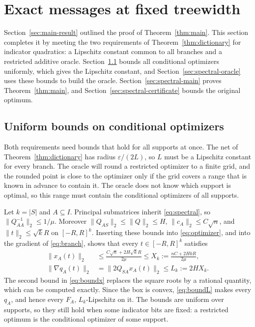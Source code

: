 \section{Exact messages at fixed treewidth}\label{sec:spectral}
Section~\ref{sec:main-result} outlined the proof of
Theorem~\ref{thm:main}. This section completes it by meeting the two
requirements of Theorem~\ref{thm:dictionary} for indicator quadratics: a
Lipschitz constant common to all branches and a restricted additive
oracle. Section~\ref{sec:spectral-bounds} bounds all conditional
optimizers uniformly, which gives the Lipschitz constant, and
Section~\ref{sec:spectral-oracle} uses these bounds to build the oracle.
Section~\ref{sec:spectral-main} proves Theorem~\ref{thm:main}, and
Section~\ref{sec:spectral-certificate} bounds the original optimum.

\subsection{Uniform bounds on conditional optimizers}
\label{sec:spectral-bounds}
Both requirements need bounds that hold for all supports at once. The
net of Theorem~\ref{thm:dictionary} has radius $\varepsilon/(2L)$, so $L$
must be a Lipschitz constant for every branch. The oracle will round a
restricted optimizer to a finite grid, and the rounded point is close to
the optimizer only if the grid covers a range that is known in advance
to contain it. The oracle does not know which support is optimal, so
this range must contain the conditional optimizers of all supports.

Let $k=|S|$ and $A\subseteq I$. Principal submatrices inherit
\eqref{eq:spectral}, so $\|Q_{AA}^{-1}\|_2\le1/\mu$. Moreover
$\|Q_{AS}\|_2\le\|Q\|_2\le H$, $\|c_A\|_2\le C\sqrt n$, and
$\|t\|_2\le\sqrt kR$ on $[-R,R]^k$. Inserting these bounds into
\eqref{eq:optimizer}, and into the gradient of \eqref{eq:branch}, shows
that every $t\in[-R,R]^k$ satisfies
\begin{align}
 \|x_A(t)\|_2&\le\frac{C\sqrt n+2H\sqrt{k}R}{2\mu}
                    \le X_k:=\frac{nC+2HkR}{2\mu},\label{eq:boundx}\\
 \|\nabla q_A(t)\|_2&=\|2Q_{SA}x_A(t)\|_2
                    \le L_k:=2HX_k.\label{eq:boundL}
\end{align}
The second bound in \eqref{eq:boundx} replaces the square roots by a
rational quantity, which can be computed exactly. Since the box is
convex, \eqref{eq:boundL} makes every $q_A$, and hence every $F_A$,
$L_k$-Lipschitz on it. The bounds are uniform over supports, so they
still hold when some indicator bits are fixed: a restricted optimum is
the conditional optimizer of some support.

